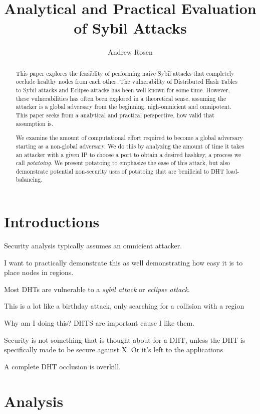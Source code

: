 \documentclass[10pt,a4paper]{article}
\author{Andrew Rosen}
\title{Analytical and Practical Evaluation of Sybil Attacks}
\begin{document}
\maketitle

\begin{abstract}
This paper explores the feasiblity of performing naive Sybil attacks that completely occlude healthy nodes from each other.
The vulnerability of Distributed Hash Tables to Sybil attacks and Eclipse attacks has been well known for some time.
However, these vulnerabilities has often been explored in a theoretical sense, assuming the attacker is a global adversary from the beginning, nigh-omnicient and omnipotent. 
This paper seeks from a analytical and practical perspective, how valid that assumption is.

We examine the amount of computational effort required to become a global adversary starting as a non-global adversary.
We do this by analyzing the amount of time it takes an attacker with a given IP to choose a port to obtain a desired hashkey, a process we call \emph{potatoing}.
We present potatoing to emphasize the ease of this attack, but also demonstrate potential non-security uses of potatoing that are benificial to DHT load-balancing. 
\end{abstract}

\section{Introductions}
Security analysis typically assumes an omnicient attacker. 

I want to practically demonstrate this as well demonstrating how easy it is to place nodes in regions.

Most DHTs are vulnerable to a \textit{sybil attack} or \textit{eclipse attack}.


This is a lot like a birthday attack, only searching for a collision with a region

Why am I doing this?
DHTS are important cause I like them.

Security is not something that is thought about for a DHT, unless the 
DHT is specifically made to be secure against X.  
Or it's left to the applications


A complete DHT occlusion is overkill.
\section{Analysis}

\cite{bellare2004hash}
\end{document}
